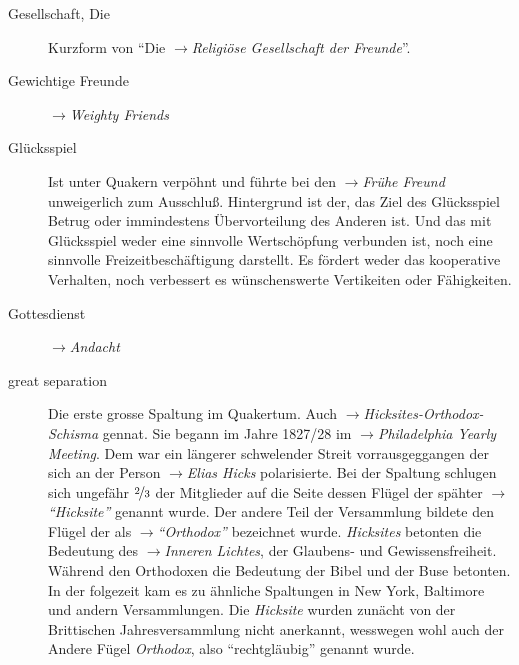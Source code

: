 \begin{description}
 \item[Gesellschaft, Die] Kurzform von "`Die
 $\to$\textit{Religiöse Gesellschaft der Freunde}"'.

\item[Gewichtige Freunde] $\to$\textit{Weighty Friends}

\item[Glücksspiel] Ist unter Quakern verpöhnt und führte bei den
$\to$\textit{Frühe Freund} unweigerlich zum Ausschluß. Hintergrund ist der,
das Ziel des Glücksspiel Betrug oder immindestens Übervorteilung des Anderen
ist. Und das mit Glücksspiel weder eine sinnvolle Wertschöpfung verbunden ist,
noch eine sinnvolle Freizeitbeschäftigung darstellt. Es fördert weder das
kooperative Verhalten, noch verbessert es wünschenswerte Vertikeiten oder
Fähigkeiten.

\item[Gottesdienst] $\to$\textit{Andacht}


 \item[great separation] Die erste grosse Spaltung im Quakertum. Auch
 $\to$\textit{Hicksites-Orthodox-Schisma} gennat. Sie begann im
 Jahre 1827/28 im $\to$\textit{Philadelphia Yearly Meeting}. Dem war ein
 längerer schwelender Streit vorrausgeggangen der sich an der Person
 $\to$\textit{Elias Hicks} polarisierte. Bei der Spaltung schlugen sich
 ungefähr $\nicefrac{2}{3}$ der Mitglieder auf die Seite dessen Flügel der
 spähter $\to$\textit{"`Hicksite"'} genannt wurde. Der andere Teil der
 Versammlung bildete den Flügel der als $\to$\textit{"`Orthodox"'} bezeichnet
 wurde. \textit{Hicksites} betonten die Bedeutung des $\to$\textit{Inneren
 Lichtes}, der Glaubens- und Gewissensfreiheit. Während den Orthodoxen die
 Bedeutung der Bibel und der Buse betonten. In der folgezeit kam es zu
 ähnliche Spaltungen in New York, Baltimore und andern Versammlungen.
 Die \textit{Hicksite} wurden zunächt von der Brittischen Jahresversammlung
 nicht anerkannt, wesswegen wohl auch der Andere Fügel \textit{Orthodox},
 also "`rechtgläubig"' genannt wurde. 


\end{description}
